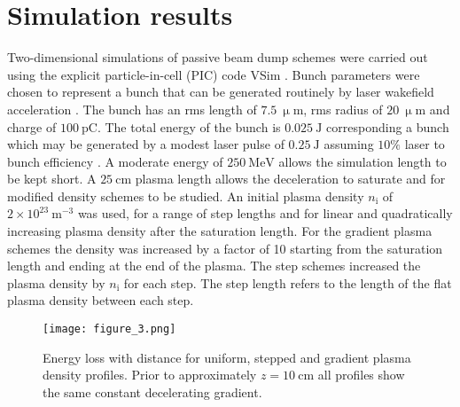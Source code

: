 \documentclass[aip,pop,preprint,superscriptaddress]{revtex4-1}
\begin{document}
\section{Simulation results}
\label{sec:results}
Two-dimensional simulations of passive beam dump schemes were carried out using the explicit particle-in-cell (PIC) code VSim \cite{VSim}. Bunch parameters were chosen to represent a bunch that can be generated routinely by laser wakefield acceleration \cite{Karsch,Osterhoff,Buck,Malka}. The bunch has an rms length of $7.5{\mathrm{\ \upmu m}}$, rms radius of $20{\mathrm{\ \upmu m}}$ and charge of $100{\mathrm{\ pC}}$. The total energy of the bunch is $0.025\mathrm{\ J}$ corresponding a bunch which may be generated by a modest laser pulse of $0.25\mathrm{\ J}$ assuming $10\%$ laser to bunch efficiency \cite{Malka_2006}.  A moderate energy of $250{\mathrm{\ MeV}}$ allows the simulation length to be kept short. A $25{\mathrm{\ cm}}$ plasma length allows the deceleration to saturate and for modified density schemes to be studied. An initial plasma density $n_{\mathrm{i}}$ of $2\times 10^{23} {\mathrm{\ m^{-3}}}$ was used, for a range of step lengths and for linear and quadratically increasing plasma density after the saturation length. For the gradient plasma schemes the density was increased by a factor of 10 starting from the saturation length and ending at the end of the plasma. The step schemes increased the plasma density by $n_{\mathrm{i}}$ for each step. The step length refers to the length of the flat plasma density between each step.

\begin{figure}[htb!]
  \centering
  \texttt{[image: figure\_3.png]}
  \caption{Energy loss with distance for uniform, stepped and gradient plasma density profiles. Prior to approximately $z=10\mathrm{\ cm}$ all profiles show the same constant decelerating gradient.}
  \label{energy_plots}
\end{figure}
\end{document}
